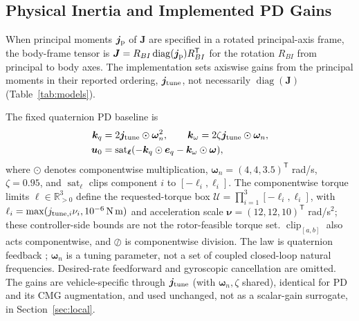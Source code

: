 \documentclass[letterpaper, 10 pt, conference]{ieeeconf}
\newcommand{\R}{\mathbb R}
\newcommand{\T}{^{\mathsf T}}
\newcommand{\sat}{\operatorname{sat}}
\newcommand{\clip}{\operatorname{clip}}
\begin{document}
\subsection{Physical Inertia and Implemented PD Gains}
When principal moments $\bm j_{\rm p}$ of $\bm J$ are specified in a rotated principal-axis frame, the body-frame tensor is $\bm J=R_{BI}\operatorname{diag}(\bm j_{\rm p})R_{BI}\T$ for the rotation $R_{BI}$ from principal to body axes. The implementation sets axiswise gains from the principal moments in their reported ordering, $\bm j_{\rm tune}$, not necessarily $\operatorname{diag}(\bm J)$ (Table~\ref{tab:models}).

The fixed quaternion PD baseline is
\begin{align}
 \bm k_q&=2\bm j_{\rm tune}\odot\bm\omega_n^2,\qquad
 \bm k_\omega=2\zeta\bm j_{\rm tune}\odot\bm\omega_n,\\
 \bm u_0&=\sat_{\bm\ell}
       (-\bm k_q\odot\bm e_q-\bm k_\omega\odot\bm\omega),
 \label{eq:pd}
\end{align}
where $\odot$ denotes componentwise multiplication,
$\bm\omega_n=(4,4,3.5)\T$ rad/s, $\zeta=0.95$, and
$\sat_{\bm\ell}$ clips component $i$ to $[-\ell_i,\ell_i]$.
%
The componentwise torque limits $\bm\ell\in\R_{>0}^3$ define the requested-torque box $\mathcal U=\prod_{i=1}^3[-\ell_i,\ell_i]$, with
$\ell_i=\max(j_{{\rm tune},i}\nu_i,10^{-6}\,\mathrm{N\,m})$ and acceleration scale $\bm\nu=(12,12,10)\T$ rad/s$^2$; these controller-side bounds are not the rotor-feasible torque set. $\clip_{[a,b]}$ also acts componentwise, and $\oslash$ is componentwise division.
The law is quaternion feedback \cite{fresk2013quaternion}; $\bm\omega_n$ is a tuning parameter, not a set of coupled closed-loop natural frequencies. Desired-rate feedforward and gyroscopic cancellation are omitted. The gains are vehicle-specific through $\bm j_{\rm tune}$ (with $\bm\omega_n,\zeta$ shared), identical for PD and its CMG augmentation, and used unchanged, not as a scalar-gain surrogate, in Section~\ref{sec:local}.
%
\end{document}
